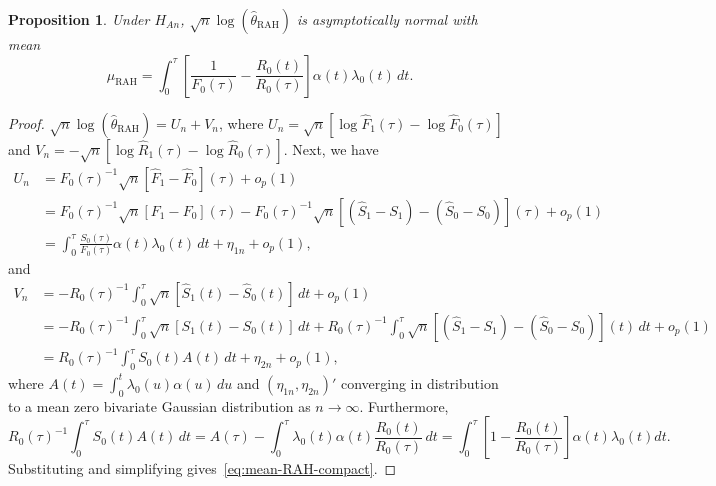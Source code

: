 \documentclass[12pt]{article}
\newtheorem{proposition}{Proposition}
\newcommand{\RAH}{\mathrm{RAH}}
\newcommand{\dd}{\,d}
\begin{document}
\begin{proposition}\label{prop:mean-rah}
Under $H_{An}$, $\sqrt{n}\log(\hat\theta_{\RAH})$ is asymptotically normal
with mean
\begin{equation}\label{eq:mean-RAH-compact}
  \mu_{\RAH}
    =\int_0^\tau
       \!\left[\frac{1}{F_0(\tau)}-\frac{R_0(t)}{R_0(\tau)}\right]
       \alpha(t)\lambda_0(t)\dd t.
\end{equation}
\end{proposition}

\begin{proof}
 $\sqrt{n}\log(\hat\theta_{\RAH})=U_n+V_n$,
where $U_n=\sqrt{n}[\log\hat F_1(\tau)-\log\hat F_0(\tau)]$
and $V_n=-\sqrt{n}[\log\hat R_1(\tau)-\log\hat R_0(\tau)]$.
Next, we have
\begin{align*}
  U_n &= F_0(\tau)^{-1}\sqrt{n}[\hat F_1-\hat F_0](\tau)+o_p(1)\\
      &=F_0(\tau)^{-1}\sqrt{n}[F_1-F_0](\tau)-F_0(\tau)^{-1}\sqrt{n}[(\hat S_1- S_1)-(\hat S_0-S_0)](\tau)+o_p(1)\\
      &=\int_0^\tau\frac{S_0(\tau)}{F_0(\tau)}\alpha(t)\lambda_0(t)\dd t+\eta_{1n}+o_p(1),
\end{align*}
and
\begin{align*}
V_n &= -R_0(\tau)^{-1}\int_0^\tau\sqrt{n}[\hat S_1(t)-\hat S_0(t)]\dd t +o_p(1)\\
    &= -R_0(\tau)^{-1}\int_0^\tau\sqrt{n}[S_1(t)-S_0(t)]\dd t +R_0(\tau)^{-1}\int_0^\tau\sqrt{n}\left[(\hat{S}_1-S_1)-(\hat{S}_0-S_0)\right](t)\dd t+o_p(1)\\
    &=R_0(\tau)^{-1}\int_0^\tau S_0(t)A(t)\dd t+\eta_{2n}+o_p(1),
\end{align*}
where $A(t)=\int_0^t\lambda_0(u)\alpha(u)\dd u$ and $(\eta_{1n}, \eta_{2n})'$ converging in distribution to a mean zero bivariate Gaussian distribution as $n\to \infty.$  Furthermore,
\[R_0(\tau)^{-1}\int_0^\tau S_0(t) A(t)\dd t=A(\tau)-\int_0^\tau\lambda_0(t)\alpha(t) \frac{R_0(t)}{R_0(\tau)}\dd t=\int_0^\tau \left[1-\frac{R_0(t)}{R_0(\tau)}\right]\alpha(t)\lambda_0(t)dt.\]
Substituting and simplifying gives~\eqref{eq:mean-RAH-compact}.
\end{proof}
\end{document}
